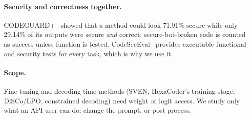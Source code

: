 \paragraph{Security and correctness together.} CODEGUARD+~\cite{fu2024codeguard} showed that a method could look
71.91\% secure while only 29.14\% of its outputs were secure \emph{and} correct; secure-but-broken code is counted as
success unless function is tested. CodeSecEval~\cite{wang2026codeseceval} provides executable functional and
security tests for every task, which is why we use it.

\paragraph{Scope.} Fine-tuning and decoding-time methods (SVEN, HexaCoder's training stage, DiSCo/LPO, constrained
decoding) need weight or logit access. We study only what an API user can do: change the prompt, or post-process.
